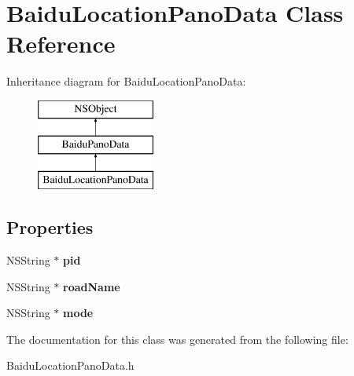 \hypertarget{interface_baidu_location_pano_data}{}\section{Baidu\+Location\+Pano\+Data Class Reference}
\label{interface_baidu_location_pano_data}
Inheritance diagram for Baidu\+Location\+Pano\+Data\+:\begin{figure}[H]
\begin{center}
\leavevmode
\includegraphics[height=3.000000cm]{interface_baidu_location_pano_data}
\end{center}
\end{figure}
\subsection*{Properties}
\begin{DoxyCompactItemize}
\item 
\hypertarget{interface_baidu_location_pano_data_a2c59bd88ac7a9f99847c41f6174654d2}{}N\+S\+String $\ast$ {\bfseries pid}\label{interface_baidu_location_pano_data_a2c59bd88ac7a9f99847c41f6174654d2}

\item 
\hypertarget{interface_baidu_location_pano_data_a94b2d368cb2467d4903c77fa55cb8574}{}N\+S\+String $\ast$ {\bfseries road\+Name}\label{interface_baidu_location_pano_data_a94b2d368cb2467d4903c77fa55cb8574}

\item 
\hypertarget{interface_baidu_location_pano_data_afc6bd63ea18ea362efa5c7eadee592e3}{}N\+S\+String $\ast$ {\bfseries mode}\label{interface_baidu_location_pano_data_afc6bd63ea18ea362efa5c7eadee592e3}

\end{DoxyCompactItemize}


The documentation for this class was generated from the following file\+:\begin{DoxyCompactItemize}
\item 
Baidu\+Location\+Pano\+Data.\+h\end{DoxyCompactItemize}
